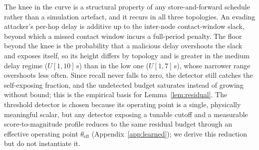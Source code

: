 The knee in the curve is a structural property of any store-and-forward
schedule rather than a simulation artefact, and it recurs in all three
topologies. An evading attacker's per-hop delay is additive up to the
inter-node contact-window slack, beyond which a missed contact window incurs a
full-period penalty. The floor beyond the knee is the probability that a
malicious delay overshoots the slack and exposes itself, so its height differs
by topology and is greater in the medium delay regime ($U[1,10]$\,s) than in the
low one ($U[1,7]$\,s), whose narrower range overshoots less often. Since recall
never falls to zero, the detector still catches the self-exposing fraction, and
the undetected budget saturates instead of growing without bound; this is the
empirical basis for Lemma~\ref{lem:residual}. The threshold detector is chosen
because its operating point is a single, physically meaningful scalar, but any
detector exposing a tunable cutoff and a measurable score-to-magnitude profile
reduces to the same residual budget through an effective operating point
$\theta_{\mathrm{eff}}$ (Appendix~\ref{app:learned}); we derive this reduction
but do not instantiate it.

